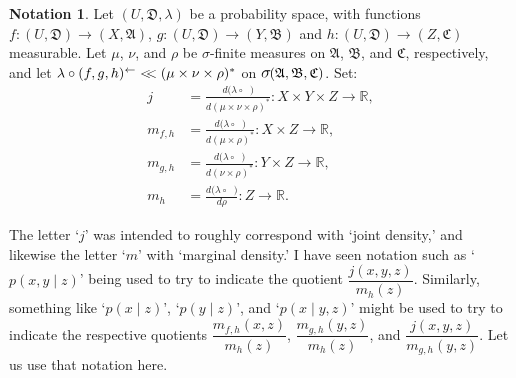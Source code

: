 \documentclass[
twoside=true,
paper=letter,
fontsize=9pt,
pagesize=auto,
leqno,
openany,
headsepline,
overfullrule,
]{scrbook}
\theoremstyle{plain}
\theoremstyle{plain}
\theoremstyle{definition}
\newtheorem{notn}[thm]{Notation}
\theoremstyle{bfnoteitalic}
\theoremstyle{bfnoteroman}
\newcommand{\sigalg}[1]{\mathfrak{#1}}
\newcommand{\textsigma}{\hbox{\large{$\sigma$}}\kern-1pt}
\newcommand{\preimage}[1]{\mathop{#1^{\leftarrow}}}
\newcommand{\R}{\mathbb{R}}
\newcommand{\sigmaalgebra}{\sigalg{A}}
\newcommand{\sigmaalgebraii}{\sigalg{B}}
\newcommand{\sigmaalgebraiii}{\sigalg{C}}
\newcommand{\funcf}{f}
\newcommand{\funcg}{g}
\newcommand{\funch}{h}
\newcommand{\funcj}{j}
\newcommand{\measurespace}{X}
\newcommand{\measurespaceii}{Y}
\newcommand{\measurespaceiii}{Z}
\newcommand{\abscont}{\mathrel{< \kern-3.5pt <}}
\newcommand{\measmu}{\mu}
\newcommand{\measnu}{\nu}
\newcommand{\measureiii}{\lambda}
\newcommand{\measlambda}{\lambda}
\newcommand{\measrho}{\rho}
\newcommand{\uspace}{U}%
\newcommand{\uspacesig}{\sigalg{D}}
\begin{document}
\begin{notn}\label{densities}
Let
$(\uspace, \uspacesig, \measureiii)$
be a probability space, with functions
$\funcf:(\uspace,\uspacesig)\to (\measurespace,\sigmaalgebra)$,
$\funcg:(\uspace,\uspacesig)\to (\measurespaceii,\sigmaalgebraii)$
and
$\funch:(\uspace,\uspacesig)\to (\measurespaceiii,\sigmaalgebraiii)$
measurable.
Let $\measmu$, $\measnu$, and $\measrho$ be \textsigma\hyp{}finite measures on
$\sigmaalgebra$, $\sigmaalgebraii$, and $\sigmaalgebraiii$, respectively, and let
$\measlambda\circ \preimage{(\funcf,\funcg,\funch)}
\abscont
(\measmu\times\measnu\times\measrho)^*$
on
$\textsigma(\sigmaalgebra,\sigmaalgebraii,\sigmaalgebraiii)$.
Set:
\begin{align*}
\funcj
& =
\frac{d \bigl(\measlambda\circ \preimage{(\funcf,\funcg,\funch)}\bigr)}
{d(\measmu\times\measnu\times\measrho)^*}
:
\measurespace\times\measurespaceii\times\measurespaceiii\to\R,
\\
%
m_{\funcf,\funch}
& =
\frac{d \bigl( \measlambda\circ \preimage{(\funcf,\funch)} \bigr)}
{d(\measmu\times\measrho)^*}
:\measurespace\times\measurespaceiii\to\R,
\\
%
m_{\funcg,\funch}
& =
\frac{d \bigl( \measlambda\circ\preimage{(\funcg,\funch)} \bigr)}
{d(\measnu\times\measrho)^*}
:\measurespaceii\times\measurespaceiii\to\R,
\\
%
m_\funch
& =
\frac{d \bigl( \measlambda\circ\preimage{\funch} \bigr)}
{d \measrho}
:\measurespaceiii\to\R.
\end{align*}

The letter `$j$' was intended to roughly correspond with `joint density,' and likewise the letter
`$m$' with `marginal density.'
I have seen notation such as `$p(x,y\mid z)$' being used to try to indicate the quotient
$\dfrac{\funcj(x,y,z)}{m_\funch (z)}$.
Similarly, something like `$p(x\mid z)$', `$p(y\mid z)$', and `$p(x\mid y,z)$' might be used to try to indicate the respective quotients
$\dfrac{m_{\funcf,\funch}(x,z)}{m_\funch (z)}$,
$\dfrac{m_{\funcg,\funch}(y,z)}{m_\funch (z)}$,
and
$\dfrac{\funcj(x,y,z)}{m_{\funcg,\funch}(y,z)}$.
Let us use that notation here.
\end{notn}
\end{document}
